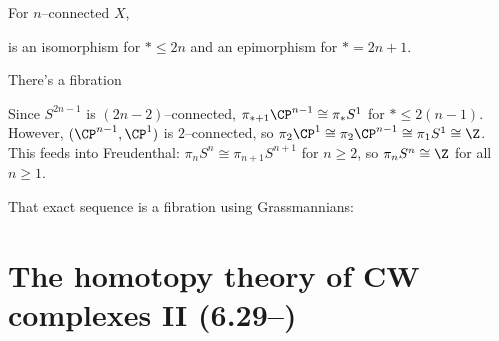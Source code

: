 \begin{corollary}
For $n$--connected $X$,
\begin{center}
\end{center}
is an isomorphism for $* \le 2n$ and an epimorphism for $* = 2n+1$.
\end{corollary}

\begin{example}
There's a fibration
\begin{center}
\end{center}
Since $S^{2n-1}$ is $(2n-2)$--connected, $\pi_{*+1} \CP^{n-1} \cong \pi_* S^1$ for $* \le 2(n-1)$.  However, $(\CP^{n-1}, \CP^1)$ is $2$--connected, so $\pi_2 \CP^1 \cong \pi_2 \CP^{n-1} \cong \pi_1 S^1 \cong \Z$.  This feeds into Freudenthal: $\pi_n S^n \cong \pi_{n+1} S^{n+1}$ for $n \ge 2$, so $\pi_n S^n \cong \Z$ for all $n \ge 1$.
\end{example}

\begin{remark}
That exact sequence is a fibration using Grassmannians:
\begin{center}
\end{center}
\end{remark}




\section{The homotopy theory of CW complexes II (6.29--)}

